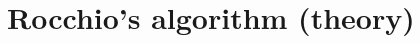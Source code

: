 
\section{Rocchio's algorithm (theory)}
\iffalse
Beschreibung des Rocchio algorithmus
\fi
\label{sec:rocchio}
